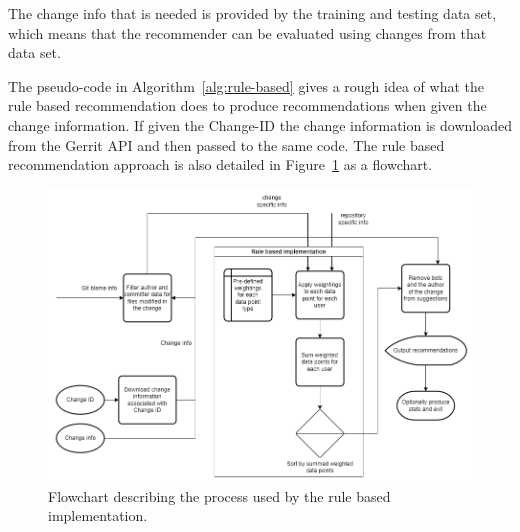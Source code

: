 The change info that is needed is provided by the training and testing data set, which means that the recommender can be evaluated using changes from that data set.

The pseudo-code in Algorithm~\ref{alg:rule-based} gives a rough idea of what the rule based recommendation does to produce recommendations when given the change information. If given the Change-ID the change information is downloaded from the Gerrit API and then passed to the same code. The rule based recommendation approach is also detailed in Figure~\ref{fig:rule-based-flowchart} as a flowchart.

\begin{figure}[h]
    \centering
    \includegraphics[scale=0.45]{images/rule-based-flowchart.png}
    \caption{Flowchart describing the process used by the rule based implementation.}
    \label{fig:rule-based-flowchart}
\end{figure}


